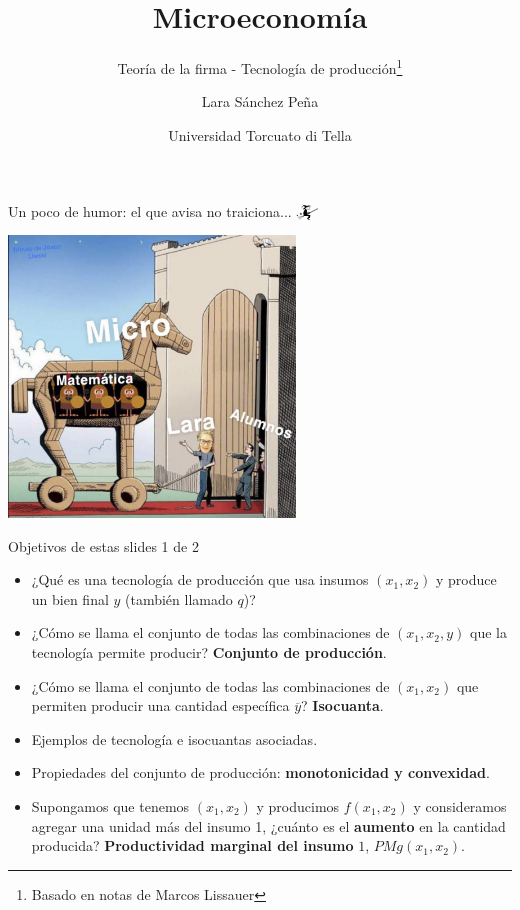 \documentclass{beamer}
\title{Microeconomía}
\subtitle{Teoría de la firma - Tecnología de producción\footnote{Basado en notas de Marcos Lissauer}\\ \mydate}
\author[Tecnología de producción]{Lara Sánchez Peña}
\date{ Universidad Torcuato di Tella}
\theoremstyle{definition}
\begin{document}
	\frame{\titlepage}
	
\begin{frame}{Un poco de humor: el que avisa no traiciona... $\mathwitch$}
    \begin{center}
\includegraphics[width=3in]{figures2/meme1.jpg}
\end{center}
\end{frame}	
	\begin{frame}{Objetivos de estas slides 1 de 2}
    \begin{itemize}
        \item ¿Qué es una tecnología de producción que usa insumos $(x_1,x_2)$ y produce un bien final $y$ (también llamado $q$)?
        \item ¿Cómo se llama el conjunto de todas las combinaciones de $(x_1,x_2,y)$ que la tecnología permite producir? \textbf{Conjunto de producción}.%
        \item ¿Cómo se llama el conjunto de todas las combinaciones de $(x_1,x_2)$ que permiten producir una cantidad específica $\overline{y}$? \textbf{Isocuanta}.
        \item Ejemplos de tecnología e isocuantas asociadas.
        \item Propiedades del conjunto de producción: \textbf{monotonicidad y convexidad}.
\item Supongamos que tenemos $(x_1,x_2)$ y producimos $f(x_1,x_2)$ y consideramos agregar una unidad más del insumo 1, ¿cuánto es el \textbf{aumento} en la cantidad producida? \textbf{Productividad marginal del insumo} $1$, $PMg(x_1,x_2)$.
        \end{itemize}
        \end{frame}
\end{document}
